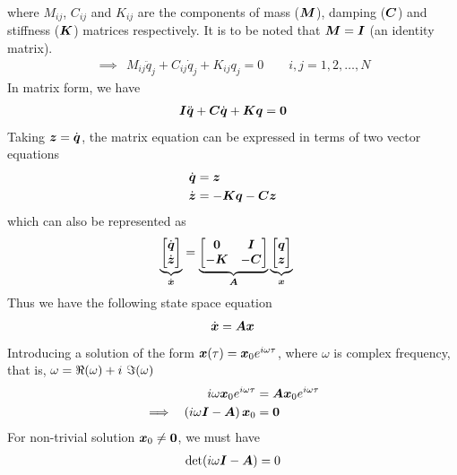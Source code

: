 \documentclass[12pt]{report}
\begin{document}
where $M_{ij}$, $C_{ij}$ and $K_{ij}$ are the components of mass ($\vb*{M}$), damping ($\vb*{C}$) and stiffness ($\vb*{K}$) matrices respectively. It is to be noted that $\vb*{M} = \vb*{I}$ (an identity matrix).
\begin{align*}
\implies ~~M_{ij} \ddot{q}_j + C_{ij}\dot{q}_j  + K_{ij}q_j = 0 \qquad i,j = 1,2, \dots, N 
\end{align*}
In matrix form, we have
\begin{align}
   \vb*{I} \ddot{\vb*{q}} + \vb*{C} \dot{\vb*{q}} + \vb*{K}\vb*{q} = \vb*{0}   \label{eqn:modal-matrix-equation}
\end{align}
Taking $\vb*{z} = \dot{\vb*{q}}$, the matrix equation can be expressed in terms of two vector equations
\begin{align*}
       \dot{\vb*{q}} &= \vb*{z} \\
       \dot{\vb*{z}} &= -\vb*{K}\vb*{q} -\vb*{C} \vb*{z}
\end{align*}
which can also be represented as
\begin{align*}
 \underbrace{\begin{bmatrix} \dot{\vb*{q}} \\ \dot{\vb*{z}} \end{bmatrix}}_{\dot{\vb*{x}}} &= \underbrace{\begin{bmatrix} \vb*{0} & \vb*{I} \\ -\vb*{K} & -\vb*{C}  \end{bmatrix}}_{\vb*{A}} \underbrace{\begin{bmatrix} \vb*{q}\\ \vb*{z} \end{bmatrix}}_{\vb*{x}}
\end{align*}
Thus we have the following state space equation
\begin{align}
   \dot{\vb*{x}} = \vb*{Ax}   \label{eqn:state-space-equation}
\end{align}
Introducing a solution of the form $\vb*{x}(\tau) = \vb*{x}_0 e^{i\omega \tau}$, where $\omega$ is complex frequency, that is, $\omega = \real (\omega) + i~\imaginary (\omega)$
\begin{align*}
i\omega \vb*{x}_0 e^{i\omega \tau} &= \vb*{A}\vb*{x}_0 e^{i\omega \tau} \\
\implies ~~\left(i\omega \vb*{I} - \vb*{A}\right)\vb*{x}_0 &= \vb*{0}
\end{align*}
For non-trivial solution $\vb*{x}_0 \neq \vb*{0}$, we must have
\begin{align*}
   \det(i\omega \vb*{I} - \vb*{A}) = 0
\end{align*}
\end{document}
